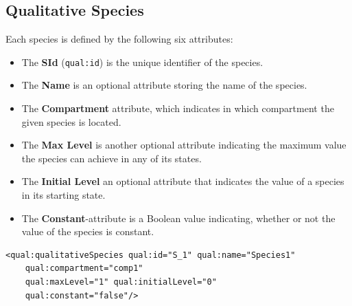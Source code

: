 \subsection{Qualitative Species}
 Each species is defined by the following six attributes:
\begin{itemize}
    \item The \textbf{SId} (\texttt{qual:id}) is the unique identifier of the species.
    \item The \textbf{Name} is an optional attribute storing the name of the species.
    \item The \textbf{Compartment} attribute, which indicates in which compartment the given species is located.
    \item The \textbf{Max Level} is another optional attribute indicating the maximum value the species can achieve in any of its states.
    \item The \textbf{Initial Level} an optional attribute that indicates the value of a species in its starting state.
    \item The \textbf{Constant}-attribute is a Boolean value indicating, whether or not the value of the species is constant.
\end{itemize}
\begin{lstlisting}[language=SBML, caption=An example of a qualitative species in SBML-qual]
<qual:qualitativeSpecies qual:id="S_1" qual:name="Species1"
    qual:compartment="comp1"
    qual:maxLevel="1" qual:initialLevel="0"
    qual:constant="false"/>
\end{lstlisting}

